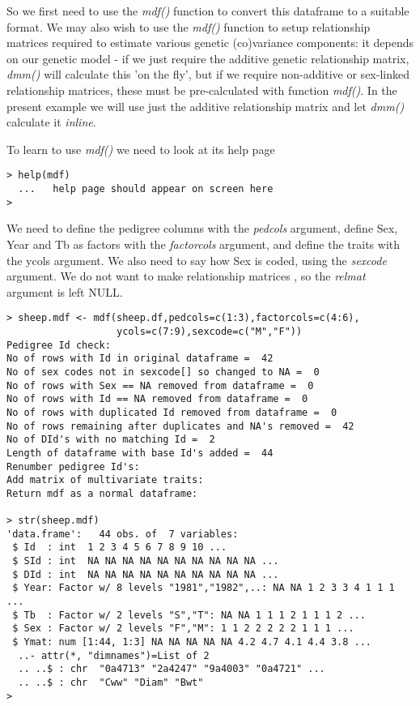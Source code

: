 \documentclass[titlepage]{article}  %
\begin{document}
So we first need to use the {\em mdf()} function to convert this dataframe to a suitable format. We may also wish to use the {\em mdf()} function to setup relationship matrices required to estimate various genetic (co)variance components: it depends on our genetic model - if we just require the additive genetic relationship matrix, {\em dmm()} will  calculate this 'on the fly', but if we require non-additive or sex-linked relationship matrices, these must be pre-calculated with function {\em mdf()}. In the present example we will use just the additive relationship matrix and let {\em dmm()} calculate it {\em inline}.

To learn to use {\em mdf()} we need to look at its help page

\begin{verbatim}
> help(mdf)
  ...   help page should appear on screen here
>
\end{verbatim}
 
We need to define the pedigree columns with the {\em pedcols} argument, define Sex, Year and Tb as factors with the {\em factorcols} argument, and define the traits with the ycols argument. We also need to say how Sex is coded, using the {\em sexcode} argument. We do not want to make relationship matrices , so the {\em relmat} argument is left NULL.

\begin{verbatim}
> sheep.mdf <- mdf(sheep.df,pedcols=c(1:3),factorcols=c(4:6),
                   ycols=c(7:9),sexcode=c("M","F"))
Pedigree Id check:
No of rows with Id in original dataframe =  42 
No of sex codes not in sexcode[] so changed to NA =  0 
No of rows with Sex == NA removed from dataframe =  0 
No of rows with Id == NA removed from dataframe =  0 
No of rows with duplicated Id removed from dataframe =  0 
No of rows remaining after duplicates and NA's removed =  42 
No of DId's with no matching Id =  2 
Length of dataframe with base Id's added =  44 
Renumber pedigree Id's:
Add matrix of multivariate traits:
Return mdf as a normal dataframe:

> str(sheep.mdf)
'data.frame':	44 obs. of  7 variables:
 $ Id  : int  1 2 3 4 5 6 7 8 9 10 ...
 $ SId : int  NA NA NA NA NA NA NA NA NA NA ...
 $ DId : int  NA NA NA NA NA NA NA NA NA NA ...
 $ Year: Factor w/ 8 levels "1981","1982",..: NA NA 1 2 3 3 4 1 1 1 ...
 $ Tb  : Factor w/ 2 levels "S","T": NA NA 1 1 1 2 1 1 1 2 ...
 $ Sex : Factor w/ 2 levels "F","M": 1 1 2 2 2 2 2 1 1 1 ...
 $ Ymat: num [1:44, 1:3] NA NA NA NA NA 4.2 4.7 4.1 4.4 3.8 ...
  ..- attr(*, "dimnames")=List of 2
  .. ..$ : chr  "0a4713" "2a4247" "9a4003" "0a4721" ...
  .. ..$ : chr  "Cww" "Diam" "Bwt"
>
\end{verbatim}
\end{document}
